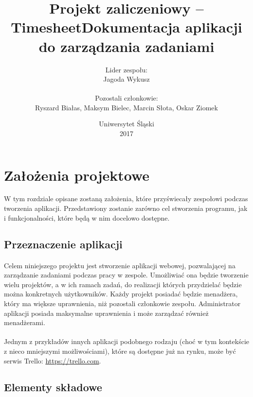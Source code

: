 \documentclass[a4paper, 12pt, oneside]{article}
\title{\textbf{Projekt zaliczeniowy -- Timesheet}\linebreak Dokumentacja aplikacji do zarządzania zadaniami\linebreak}
\author{
Lider zespołu:\\
Jagoda Wykusz\\
\\
Pozostali członkowie:\\
Ryszard Białas,
Maksym Bielec,
Marcin Słota,
Oskar Ziomek\\
\linebreak}
\date{Uniwersytet Śląski\\2017}
\begin{document}

\maketitle
\thispagestyle{empty}

\newpage


\tableofcontents
\newpage


\section{Założenia projektowe}
\paragraph{} W tym rozdziale opisane zostaną założenia, które przyświecały zespołowi podczas tworzenia aplikacji. Przedstawiony zostanie zarówno cel stworzenia programu, jak i funkcjonalności, które będą w nim docelowo dostępne.
	\subsection{Przeznaczenie aplikacji}
		\paragraph{}Celem niniejszego projektu jest stworzenie aplikacji webowej, pozwalającej na zarządzanie zadaniami podczas pracy w zespole. Umożliwiać ona będzie tworzenie wielu projektów, a w ich ramach zadań, do realizacji których przydzielać będzie można konkretnych użytkowników. Każdy projekt posiadać będzie menadżera, który ma większe uprawnienia, niż pozostali członkowie zespołu. Administrator aplikacji posiada maksymalne uprawnienia i może zarządzać również menadżerami.
		\paragraph{}Jednym z przykładów innych aplikacji podobnego rodzaju (choć w tym kontekście z nieco mniejszymi możliwościami), które są dostępne już na rynku, może być serwis Trello: \url{https://trello.com}.
	\subsection{Elementy składowe}
\end{document}
